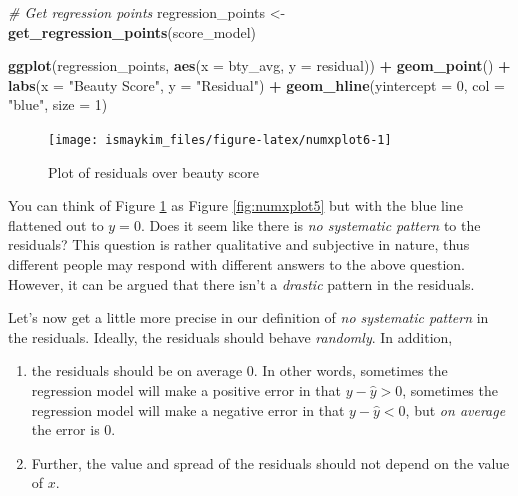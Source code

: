 \documentclass[12pt, krantz2,]{krantz}
\makeatletter
\newenvironment{Shaded}{\begin{snugshade}}{\end{snugshade}}
\newcommand{\CommentTok}[1]{\textcolor[rgb]{0.37,0.37,0.37}{\textit{#1}}}
\newcommand{\DataTypeTok}[1]{\textcolor[rgb]{0.27,0.27,0.27}{#1}}
\newcommand{\DecValTok}[1]{\textcolor[rgb]{0.06,0.06,0.06}{#1}}
\newcommand{\KeywordTok}[1]{\textcolor[rgb]{0.27,0.27,0.27}{\textbf{#1}}}
\newcommand{\NormalTok}[1]{#1}
\newcommand{\OperatorTok}[1]{\textcolor[rgb]{0.43,0.43,0.43}{\textbf{#1}}}
\newcommand{\StringTok}[1]{\textcolor[rgb]{0.5,0.5,0.5}{#1}}
\providecommand{\tightlist}{%
  \setlength{\itemsep}{0pt}\setlength{\parskip}{0pt}}
\newenvironment{kframe}{%
\medskip{}
\setlength{\fboxsep}{.8em}
 \def\at@end@of@kframe{}%
 \ifinner\ifhmode%
  \def\at@end@of@kframe{\end{minipage}}%
  \begin{minipage}{\columnwidth}%
 \fi\fi%
 \def\FrameCommand##1{\hskip\@totalleftmargin \hskip-\fboxsep
 \colorbox{shadecolor}{##1}\hskip-\fboxsep
     \hskip-\linewidth \hskip-\@totalleftmargin \hskip\columnwidth}%
 \MakeFramed {\advance\hsize-\width
   \@totalleftmargin\z@ \linewidth\hsize
   \@setminipage}}%
 {\par\unskip\endMakeFramed%
 \at@end@of@kframe}
\renewenvironment{Shaded}{\begin{kframe}}{\end{kframe}}
\makeatother
\begin{document}
\begin{Shaded}
\begin{Highlighting}[]
\CommentTok{# Get regression points}
\NormalTok{regression_points <-}\StringTok{ }\KeywordTok{get_regression_points}\NormalTok{(score_model)}
\end{Highlighting}
\end{Shaded}

\begin{Shaded}
\begin{Highlighting}[]
\KeywordTok{ggplot}\NormalTok{(regression_points, }\KeywordTok{aes}\NormalTok{(}\DataTypeTok{x =}\NormalTok{ bty_avg, }\DataTypeTok{y =}\NormalTok{ residual)) }\OperatorTok{+}
\StringTok{  }\KeywordTok{geom_point}\NormalTok{() }\OperatorTok{+}
\StringTok{  }\KeywordTok{labs}\NormalTok{(}\DataTypeTok{x =} \StringTok{"Beauty Score"}\NormalTok{, }\DataTypeTok{y =} \StringTok{"Residual"}\NormalTok{) }\OperatorTok{+}
\StringTok{  }\KeywordTok{geom_hline}\NormalTok{(}\DataTypeTok{yintercept =} \DecValTok{0}\NormalTok{, }\DataTypeTok{col =} \StringTok{"blue"}\NormalTok{, }\DataTypeTok{size =} \DecValTok{1}\NormalTok{)}
\end{Highlighting}
\end{Shaded}

\begin{figure}

{\centering \texttt{[image: ismaykim\_files/figure-latex/numxplot6-1]} 

}

\caption{Plot of residuals over beauty score}\label{fig:numxplot6}
\end{figure}

You can think of Figure \ref{fig:numxplot6} as Figure \ref{fig:numxplot5} but with the blue line flattened out to \(y=0\). Does it seem like there is \emph{no systematic pattern} to the residuals? This question is rather qualitative and subjective in nature, thus different people may respond with different answers to the above question. However, it can be argued that there isn't a \emph{drastic} pattern in the residuals.

Let's now get a little more precise in our definition of \emph{no systematic pattern} in the residuals. Ideally, the residuals should behave \emph{randomly}. In addition,

\begin{enumerate}
\def\labelenumi{\arabic{enumi}.}
\tightlist
\item
  the residuals should be on average 0. In other words, sometimes the regression model will make a positive error in that \(y - \widehat{y} > 0\), sometimes the regression model will make a negative error in that \(y - \widehat{y} < 0\), but \emph{on average} the error is 0.
\item
  Further, the value and spread of the residuals should not depend on the value of \(x\).
\end{enumerate}
\end{document}
